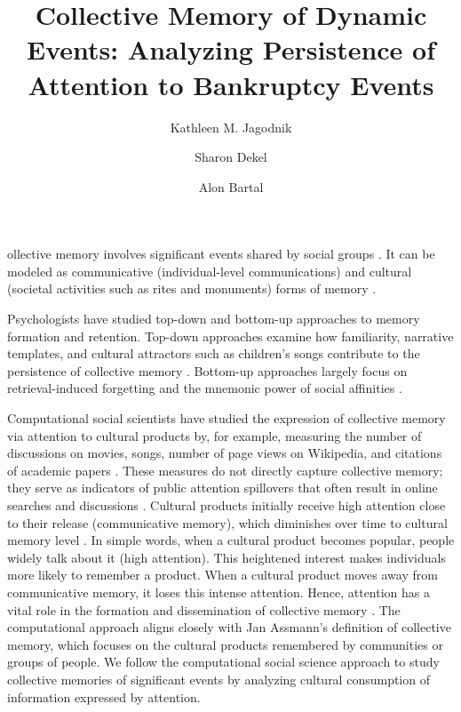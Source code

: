 \documentclass[9pt,twocolumn,twoside,lineno]{pnas-new}
\title{Collective Memory of Dynamic Events: Analyzing Persistence of Attention to Bankruptcy Events}
\author[a,b,c,1]{Kathleen M. Jagodnik}
\author[a,b]{Sharon Dekel}
\author[c]{Alon Bartal}
\affil[a] {Department of Psychiatry, Harvard Medical School, Boston, Massachusetts, USA}
\affil[b] {Department of Psychiatry, Massachusetts General Hospital, Boston, Massachusetts, USA}
\affil[c] {The School of Business Administration, Bar-Ilan University, Ramat Gan, 5290002, Israel}
\begin{document}
\maketitle
\thispagestyle{firststyle}




ollective memory involves significant events shared by social groups \cite{halbwachs1992collective}.
It can be modeled as communicative (individual-level communications) and cultural (societal activities such as rites and monuments) forms of memory \cite{assmann1995collective, candia2019universal}.

Psychologists have studied top-down and bottom-up approaches to memory formation and retention. 
Top-down approaches examine how familiarity, narrative templates, and cultural attractors such as children's songs \cite{rubin1995memory} contribute to the persistence of collective memory \cite{rubin1995memory,buskell2017cultural,roediger2016recognizing}.
Bottom-up approaches largely focus on retrieval-induced forgetting and the mnemonic power of social affinities \cite{hirst2018collective, coman2015social}.

Computational social scientists have studied the expression of collective memory via  attention to cultural products by, for example, measuring the number of discussions on movies, songs, number of page views on Wikipedia, and citations of academic papers \cite{yu2016pantheon, candia2019universal, west2021postmortem, jara2019medium, higham2017fame}. 
These measures do not directly capture collective memory; they serve as indicators of public attention spillovers that often result in online searches and discussions \cite{candia2019universal}.
Cultural products initially receive high attention close to their release (communicative memory), which diminishes over time to cultural memory level \cite{west2021postmortem, candia2019universal}.
In simple words, when a cultural product becomes popular, people widely talk about it (high attention).
This heightened interest makes individuals more likely to remember a product.
When a cultural product moves away from communicative memory, it loses this intense attention.
Hence, attention has a vital role in the formation and dissemination of collective memory \cite{candia2019universal}.
The computational approach aligns closely with Jan Assmann's \cite{assmann2011communicative} definition of collective memory, which focuses on the cultural products remembered by communities or groups of people.
We follow the computational social science approach to study collective  memories of significant events by analyzing cultural consumption of information expressed by attention. 
\end{document}
